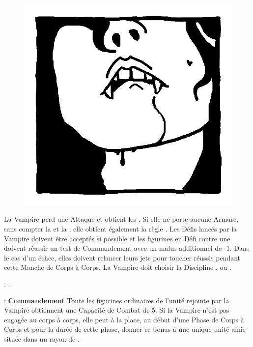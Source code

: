 \newpage
{}

\begin{figure}
\centering
\includegraphics[width=\logosize]{logos/logo_lamia.png}
\end{figure}
La Vampire perd une Attaque et obtient les \lightningreflexes{}. Si elle ne porte aucune Armure, sans compter la \mountsprotection{} et la \innatedefence{}, elle obtient également la règle \distracting{}. Les Défis lancés par la Vampire doivent être acceptés si possible et les figurines en Défi contre une \lamia{} doivent réussir un test de Commandement avec un malus additionnel de -1. Dans le cas d'un échec, elles doivent relancer leurs jets pour toucher réussis pendant cette Manche de Corps à Corps. La Vampire doit choisir la Discipline \light{}, \shadows{} ou \necromancy{}.

\vspace{0.5cm}
\bloodties{} : \textbf{\courtofthedamned{}}.

\vspace{0.5cm}
\ancientbloodpower{} : \textbf{Commandement}\dotfill{}\newline%
Toute les figurines ordinaires de l'unité rejointe par la Vampire obtiennent une Capacité de Combat de 5. Si la Vampire n'est pas engagée au corps à corps, elle peut à la place, au début d'une Phase de Corps à Corps et pour la durée de cette phase, donner ce bonus à une unique unité amie située dans un rayon de .

